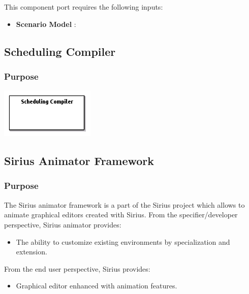 \documentclass{gemoc} %
\begin{document}
This component port requires the following inputs:
\begin{itemize}
  \item \textbf{Scenario Model} :
\end{itemize}



\subsection{Scheduling Compiler}


\subsubsection{Purpose}


\begin{center}
\includegraphics*[trim=0.0cm 0.0cm 0cm 0.0cm, clip=true]{../images/generated/Generated_Scheduling_Compiler.png}
\end{center}




\subsection{Sirius Animator Framework}


\subsubsection{Purpose}
The Sirius animator framework is a part of the Sirius project which allows to animate graphical editors created with Sirius.
From the specifier/developer perspective, Sirius animator provides:
\begin{itemize}
\item The ability to customize existing environments by specialization and extension.
\end{itemize}
From the end user perspective, Sirius provides:
\begin{itemize}
\item Graphical editor enhanced with animation features.
\end{itemize}
\end{document}
